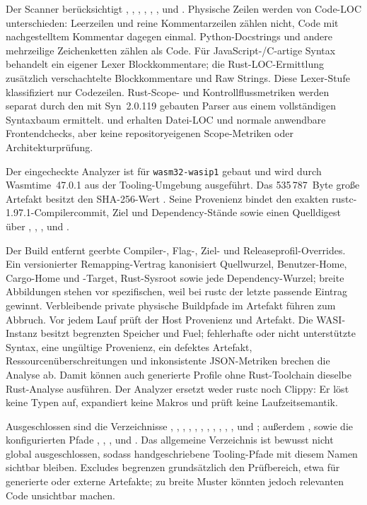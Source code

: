 Der Scanner berücksichtigt , , , ,
, ,  und . Physische Zeilen werden
von Code-LOC unterschieden: Leerzeilen und reine Kommentarzeilen zählen nicht,
Code mit nachgestelltem Kommentar dagegen einmal. Python-Docstrings und andere
mehrzeilige Zeichenketten zählen als Code. Für JavaScript-/C-artige Syntax
behandelt ein eigener Lexer Blockkommentare; die Rust-LOC-Ermittlung zusätzlich
verschachtelte Blockkommentare und Raw Strings. Diese Lexer-Stufe klassifiziert
nur Codezeilen. Rust-Scope- und Kontrollflussmetriken werden separat durch den
mit Syn~2.0.119 gebauten Parser aus einem vollständigen Syntaxbaum ermittelt.
 und  erhalten Datei-LOC und normale anwendbare
Frontendchecks, aber keine repositoryeigenen Scope-Metriken oder
Architekturprüfung.

Der eingecheckte Analyzer ist für \texttt{wasm32-wasip1} gebaut und wird durch
Wasmtime~47.0.1 aus der Tooling-Umgebung ausgeführt. Das 535\,787~Byte große
Artefakt besitzt den SHA-256-Wert
.
Seine Provenienz bindet den exakten rustc-1.97.1-Compilercommit, Ziel und
Dependency-Stände sowie einen Quelldigest über ,
, ,  und
.

Der Build entfernt geerbte Compiler-, Flag-, Ziel- und Releaseprofil-Overrides.
Ein versionierter Remapping-Vertrag kanonisiert Quellwurzel, Benutzer-Home,
Cargo-Home und -Target, Rust-Sysroot sowie jede Dependency-Wurzel; breite
Abbildungen stehen vor spezifischen, weil bei rustc der letzte passende Eintrag
gewinnt. Verbleibende private physische Buildpfade im Artefakt führen zum
Abbruch. Vor jedem Lauf prüft der Host Provenienz und Artefakt. Die WASI-Instanz
besitzt begrenzten Speicher und Fuel; fehlerhafte oder nicht unterstützte
Syntax, eine ungültige Provenienz, ein defektes Artefakt,
Ressourcenüberschreitungen und inkonsistente JSON-Metriken brechen die Analyse
ab. Damit können auch generierte Profile ohne Rust-Toolchain dieselbe
Rust-Analyse ausführen. Der Analyzer ersetzt weder rustc noch Clippy: Er löst
keine Typen auf, expandiert keine Makros und prüft keine Laufzeitsemantik.

Ausgeschlossen sind die Verzeichnisse , ,
, , , ,
, , , ,
,  und ; außerdem
,  sowie die konfigurierten Pfade
, , ,
 und . Das allgemeine
Verzeichnis  ist bewusst nicht global ausgeschlossen, sodass
handgeschriebene Tooling-Pfade mit diesem Namen sichtbar bleiben. Excludes
begrenzen grundsätzlich den Prüfbereich, etwa für generierte oder externe
Artefakte; zu breite Muster könnten jedoch relevanten Code unsichtbar machen.

